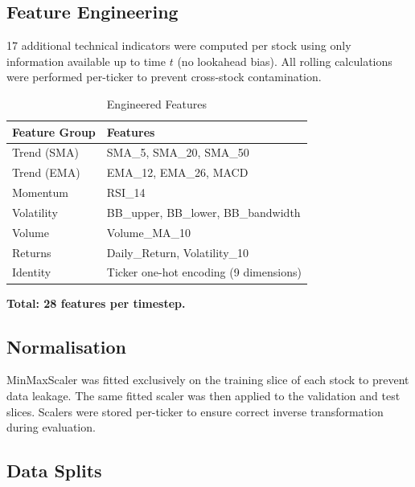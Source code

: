 \documentclass[12pt, a4paper]{article}
\begin{document}
\subsection{Feature Engineering}

17 additional technical indicators were computed per stock using only information available up to time $t$ (no lookahead bias). All rolling calculations were performed per-ticker to prevent cross-stock contamination.

\vspace{8pt}
\begin{table}[H]
\caption{Engineered Features}
\label{tab:features}
\begin{tabularx}{\textwidth}{L{3.8cm} X}
\color{white}\textbf{Feature Group} & \color{white}\textbf{Features} \\
\midrule
Trend (SMA)   & SMA\_5, SMA\_20, SMA\_50 \\
Trend (EMA)   & EMA\_12, EMA\_26, MACD \\
Momentum      & RSI\_14 \\
Volatility    & BB\_upper, BB\_lower, BB\_bandwidth \\
Volume        & Volume\_MA\_10 \\
Returns       & Daily\_Return, Volatility\_10 \\
Identity      & Ticker one-hot encoding (9 dimensions) \\
\bottomrule
\end{tabularx}
\end{table}

\textbf{Total: 28 features per timestep.}

\subsection{Normalisation}

MinMaxScaler was fitted exclusively on the training slice of each stock to prevent data leakage. The same fitted scaler was then applied to the validation and test slices. Scalers were stored per-ticker to ensure correct inverse transformation during evaluation.

\subsection{Data Splits}
\end{document}
